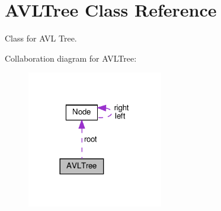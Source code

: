 \hypertarget{class_a_v_l_tree}{}\section{A\+V\+L\+Tree Class Reference}
\label{class_a_v_l_tree}


Class for A\+VL Tree.  




Collaboration diagram for A\+V\+L\+Tree\+:
\nopagebreak
\begin{figure}[H]
\begin{center}
\leavevmode
\includegraphics[width=168pt]{class_a_v_l_tree__coll__graph}
\end{center}
\end{figure}

